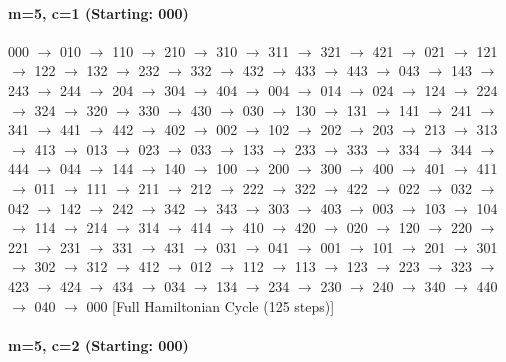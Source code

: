 \paragraph{m=5, c=1 (Starting: 000)}


000 $\rightarrow$ 010 $\rightarrow$ 110 $\rightarrow$ 210 $\rightarrow$ 310 $\rightarrow$ 311 $\rightarrow$ 321 $\rightarrow$ 421 $\rightarrow$ 021 $\rightarrow$ 121 $\rightarrow$ 122 $\rightarrow$ 132 $\rightarrow$ 232 $\rightarrow$ 332 $\rightarrow$ 432 $\rightarrow$ 433 $\rightarrow$ 443 $\rightarrow$ 043 $\rightarrow$ 143 $\rightarrow$ 243 $\rightarrow$ 244 $\rightarrow$ 204 $\rightarrow$ 304 $\rightarrow$ 404 $\rightarrow$ 004 $\rightarrow$ 014 $\rightarrow$ 024 $\rightarrow$ 124 $\rightarrow$ 224 $\rightarrow$ 324 $\rightarrow$ 320 $\rightarrow$ 330 $\rightarrow$ 430 $\rightarrow$ 030 $\rightarrow$ 130 $\rightarrow$ 131 $\rightarrow$ 141 $\rightarrow$ 241 $\rightarrow$ 341 $\rightarrow$ 441 $\rightarrow$ 442 $\rightarrow$ 402 $\rightarrow$ 002 $\rightarrow$ 102 $\rightarrow$ 202 $\rightarrow$ 203 $\rightarrow$ 213 $\rightarrow$ 313 $\rightarrow$ 413 $\rightarrow$ 013 $\rightarrow$ 023 $\rightarrow$ 033 $\rightarrow$ 133 $\rightarrow$ 233 $\rightarrow$ 333 $\rightarrow$ 334 $\rightarrow$ 344 $\rightarrow$ 444 $\rightarrow$ 044 $\rightarrow$ 144 $\rightarrow$ 140 $\rightarrow$ 100 $\rightarrow$ 200 $\rightarrow$ 300 $\rightarrow$ 400 $\rightarrow$ 401 $\rightarrow$ 411 $\rightarrow$ 011 $\rightarrow$ 111 $\rightarrow$ 211 $\rightarrow$ 212 $\rightarrow$ 222 $\rightarrow$ 322 $\rightarrow$ 422 $\rightarrow$ 022 $\rightarrow$ 032 $\rightarrow$ 042 $\rightarrow$ 142 $\rightarrow$ 242 $\rightarrow$ 342 $\rightarrow$ 343 $\rightarrow$ 303 $\rightarrow$ 403 $\rightarrow$ 003 $\rightarrow$ 103 $\rightarrow$ 104 $\rightarrow$ 114 $\rightarrow$ 214 $\rightarrow$ 314 $\rightarrow$ 414 $\rightarrow$ 410 $\rightarrow$ 420 $\rightarrow$ 020 $\rightarrow$ 120 $\rightarrow$ 220 $\rightarrow$ 221 $\rightarrow$ 231 $\rightarrow$ 331 $\rightarrow$ 431 $\rightarrow$ 031 $\rightarrow$ 041 $\rightarrow$ 001 $\rightarrow$ 101 $\rightarrow$ 201 $\rightarrow$ 301 $\rightarrow$ 302 $\rightarrow$ 312 $\rightarrow$ 412 $\rightarrow$ 012 $\rightarrow$ 112 $\rightarrow$ 113 $\rightarrow$ 123 $\rightarrow$ 223 $\rightarrow$ 323 $\rightarrow$ 423 $\rightarrow$ 424 $\rightarrow$ 434 $\rightarrow$ 034 $\rightarrow$ 134 $\rightarrow$ 234 $\rightarrow$ 230 $\rightarrow$ 240 $\rightarrow$ 340 $\rightarrow$ 440 $\rightarrow$ 040 $\rightarrow$ 000 [Full Hamiltonian Cycle (125 steps)]

\paragraph{m=5, c=2 (Starting: 000)}


